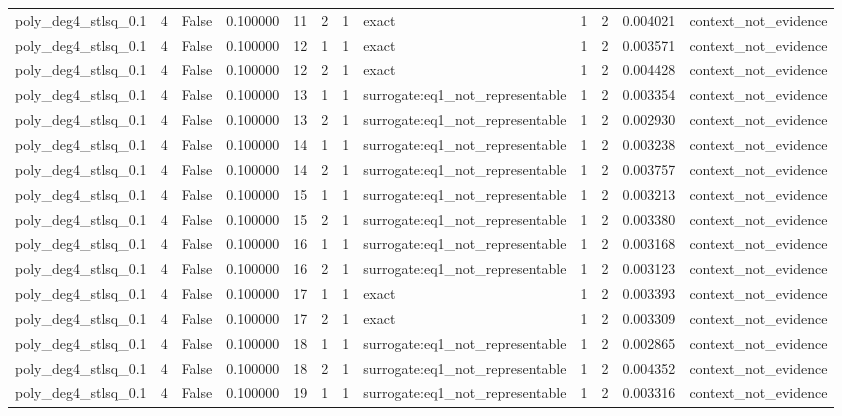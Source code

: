 \begin{tabular}{lrrrrrrlrrrl}
poly\_deg4\_stlsq\_0.1 & 4 & False & 0.100000 & 11 & 2 & 1 & exact & 1 & 2 & 0.004021 & context\_not\_evidence \\
poly\_deg4\_stlsq\_0.1 & 4 & False & 0.100000 & 12 & 1 & 1 & exact & 1 & 2 & 0.003571 & context\_not\_evidence \\
poly\_deg4\_stlsq\_0.1 & 4 & False & 0.100000 & 12 & 2 & 1 & exact & 1 & 2 & 0.004428 & context\_not\_evidence \\
poly\_deg4\_stlsq\_0.1 & 4 & False & 0.100000 & 13 & 1 & 1 & surrogate:eq1\_not\_representable & 1 & 2 & 0.003354 & context\_not\_evidence \\
poly\_deg4\_stlsq\_0.1 & 4 & False & 0.100000 & 13 & 2 & 1 & surrogate:eq1\_not\_representable & 1 & 2 & 0.002930 & context\_not\_evidence \\
poly\_deg4\_stlsq\_0.1 & 4 & False & 0.100000 & 14 & 1 & 1 & surrogate:eq1\_not\_representable & 1 & 2 & 0.003238 & context\_not\_evidence \\
poly\_deg4\_stlsq\_0.1 & 4 & False & 0.100000 & 14 & 2 & 1 & surrogate:eq1\_not\_representable & 1 & 2 & 0.003757 & context\_not\_evidence \\
poly\_deg4\_stlsq\_0.1 & 4 & False & 0.100000 & 15 & 1 & 1 & surrogate:eq1\_not\_representable & 1 & 2 & 0.003213 & context\_not\_evidence \\
poly\_deg4\_stlsq\_0.1 & 4 & False & 0.100000 & 15 & 2 & 1 & surrogate:eq1\_not\_representable & 1 & 2 & 0.003380 & context\_not\_evidence \\
poly\_deg4\_stlsq\_0.1 & 4 & False & 0.100000 & 16 & 1 & 1 & surrogate:eq1\_not\_representable & 1 & 2 & 0.003168 & context\_not\_evidence \\
poly\_deg4\_stlsq\_0.1 & 4 & False & 0.100000 & 16 & 2 & 1 & surrogate:eq1\_not\_representable & 1 & 2 & 0.003123 & context\_not\_evidence \\
poly\_deg4\_stlsq\_0.1 & 4 & False & 0.100000 & 17 & 1 & 1 & exact & 1 & 2 & 0.003393 & context\_not\_evidence \\
poly\_deg4\_stlsq\_0.1 & 4 & False & 0.100000 & 17 & 2 & 1 & exact & 1 & 2 & 0.003309 & context\_not\_evidence \\
poly\_deg4\_stlsq\_0.1 & 4 & False & 0.100000 & 18 & 1 & 1 & surrogate:eq1\_not\_representable & 1 & 2 & 0.002865 & context\_not\_evidence \\
poly\_deg4\_stlsq\_0.1 & 4 & False & 0.100000 & 18 & 2 & 1 & surrogate:eq1\_not\_representable & 1 & 2 & 0.004352 & context\_not\_evidence \\
poly\_deg4\_stlsq\_0.1 & 4 & False & 0.100000 & 19 & 1 & 1 & surrogate:eq1\_not\_representable & 1 & 2 & 0.003316 & context\_not\_evidence \\

\end{tabular}
